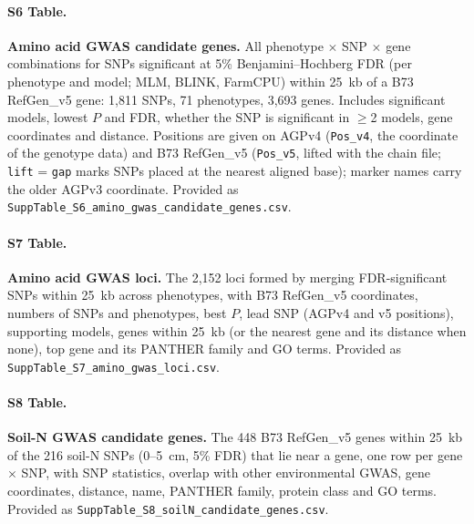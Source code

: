 \paragraph*{S6 Table.}
\makeatletter
\def\@currentlabelname{S6 Table}
\makeatother
\label{S6_Table}
\textbf{Amino acid GWAS candidate genes.} All phenotype $\times$ SNP $\times$ gene combinations for SNPs significant at 5\% Benjamini--Hochberg FDR (per phenotype and model; MLM, BLINK, FarmCPU) within 25~kb of a B73 RefGen\_v5 gene: 1,811 SNPs, 71 phenotypes, 3,693 genes. Includes significant models, lowest $P$ and FDR, whether the SNP is significant in $\geq$2 models, gene coordinates and distance. Positions are given on AGPv4 (\texttt{Pos\_v4}, the coordinate of the genotype data) and B73 RefGen\_v5 (\texttt{Pos\_v5}, lifted with the chain file; \texttt{lift} = \texttt{gap} marks SNPs placed at the nearest aligned base); marker names carry the older AGPv3 coordinate. Provided as \texttt{SuppTable\_S6\_amino\_gwas\_candidate\_genes.csv}.

\paragraph*{S7 Table.}
\makeatletter
\def\@currentlabelname{S7 Table}
\makeatother
\label{S7_Table}
\textbf{Amino acid GWAS loci.} The 2,152 loci formed by merging FDR-significant SNPs within 25~kb across phenotypes, with B73 RefGen\_v5 coordinates, numbers of SNPs and phenotypes, best $P$, lead SNP (AGPv4 and v5 positions), supporting models, genes within 25~kb (or the nearest gene and its distance when none), top gene and its PANTHER family and GO terms. Provided as \texttt{SuppTable\_S7\_amino\_gwas\_loci.csv}.

\paragraph*{S8 Table.}
\makeatletter
\def\@currentlabelname{S8 Table}
\makeatother
\label{S8_Table}
\textbf{Soil-N GWAS candidate genes.} The 448 B73 RefGen\_v5 genes within 25~kb of the 216 soil-N SNPs (0--5~cm, 5\% FDR) that lie near a gene, one row per gene $\times$ SNP, with SNP statistics, overlap with other environmental GWAS, gene coordinates, distance, name, PANTHER family, protein class and GO terms. Provided as \texttt{SuppTable\_S8\_soilN\_candidate\_genes.csv}.

